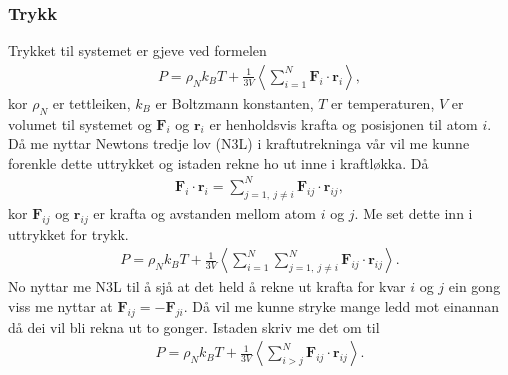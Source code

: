 \documentclass[12pt, a4paper]{article}
\theoremstyle{definition}
\newcommand{\vb}{\mathbf}
\begin{document}
        \subsubsection*{Trykk}
            Trykket til systemet er gjeve ved formelen 
            \begin{align*}
                P = \rho_Nk_BT + \frac{1}{3V}\left \langle \sum_{i = 1}^N \vb{F}_{i}\cdot\vb{r}_{i} \right \rangle,
            \end{align*}
            kor $\rho_N$ er tettleiken, $k_B$ er Boltzmann konstanten, $T$ er temperaturen, $V$ er volumet til systemet og $\vb{F}_i$ og $\vb{r}_i$ er henholdsvis krafta
            og posisjonen til atom $i$. Då me nyttar Newtons tredje lov (N3L) i kraftutrekninga vår vil me kunne forenkle dette uttrykket og istaden rekne ho ut inne i kraftløkka.
            Då 
            \begin{align*}
                \vb{F}_i\cdot\vb{r}_i = \sum_{j = 1, \ j \neq i}^{N}\vb{F}_{ij}\cdot\vb{r}_{ij},
            \end{align*}
            kor $\vb{F}_{ij}$ og $\vb{r}_{ij}$ er krafta og avstanden mellom atom $i$ og $j$. Me set dette inn i uttrykket for trykk.
            \begin{align*}
                P = \rho_Nk_BT + \frac{1}{3V}\left \langle \sum_{i = 1}^N \sum_{j = 1, \ j \neq i}^{N}\vb{F}_{ij}\cdot\vb{r}_{ij} \right \rangle.
            \end{align*}
            No nyttar me N3L til å sjå at det held å rekne ut krafta for kvar $i$ og $j$ ein gong viss me nyttar at $\vb{F}_{ij} = -\vb{F}_{ji}$. Då vil me kunne stryke
            mange ledd mot einannan då dei vil bli rekna ut to gonger. Istaden skriv me det om til
            \begin{align*}
                P = \rho_Nk_BT + \frac{1}{3V}\left \langle \sum_{i > j}^N \vb{F}_{ij}\cdot\vb{r}_{ij} \right \rangle.
            \end{align*}
\end{document}
